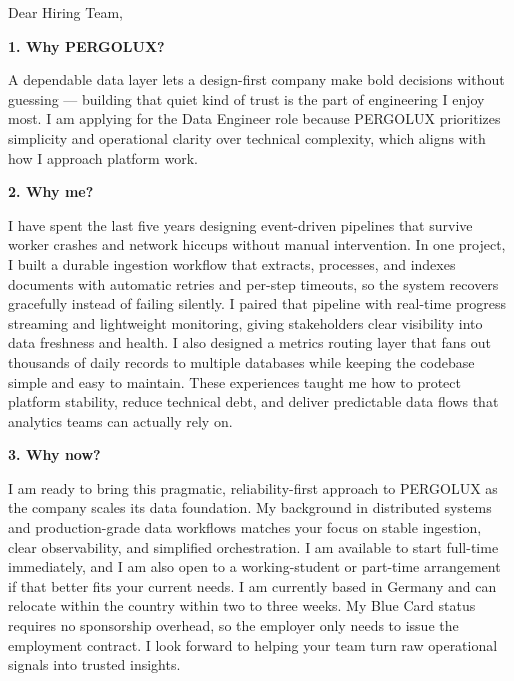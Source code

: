 \documentclass[11pt,a4paper]{coverletter}
\begin{document}

\opening{Dear Hiring Team,}

\vspace{8pt}\noindent\textbf{1. Why PERGOLUX?}\par\vspace{3pt}

A dependable data layer lets a design-first company make bold decisions without guessing — building that quiet kind of trust is the part of engineering I enjoy most. I am applying for the Data Engineer role because PERGOLUX prioritizes simplicity and operational clarity over technical complexity, which aligns with how I approach platform work.

\vspace{8pt}\noindent\textbf{2. Why me?}\par\vspace{3pt}

I have spent the last five years designing event-driven pipelines that survive worker crashes and network hiccups without manual intervention. In one project, I built a durable ingestion workflow that extracts, processes, and indexes documents with automatic retries and per-step timeouts, so the system recovers gracefully instead of failing silently. I paired that pipeline with real-time progress streaming and lightweight monitoring, giving stakeholders clear visibility into data freshness and health. I also designed a metrics routing layer that fans out thousands of daily records to multiple databases while keeping the codebase simple and easy to maintain. These experiences taught me how to protect platform stability, reduce technical debt, and deliver predictable data flows that analytics teams can actually rely on.

\vspace{8pt}\noindent\textbf{3. Why now?}\par\vspace{3pt}

I am ready to bring this pragmatic, reliability-first approach to PERGOLUX as the company scales its data foundation. My background in distributed systems and production-grade data workflows matches your focus on stable ingestion, clear observability, and simplified orchestration. I am available to start full-time immediately, and I am also open to a working-student or part-time arrangement if that better fits your current needs. I am currently based in Germany and can relocate within the country within two to three weeks. My Blue Card status requires no sponsorship overhead, so the employer only needs to issue the employment contract. I look forward to helping your team turn raw operational signals into trusted insights.
\end{document}
